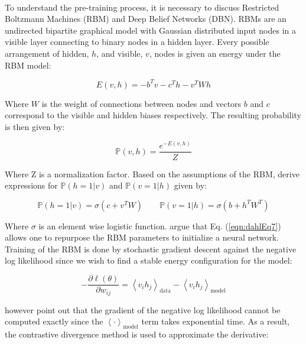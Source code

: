 \documentclass[letterpaper]{article}
\newcommand{\cprob}[2]{ \prob{#1 \lvert #2} }
\newcommand{\prob}[1]{\mathbb{P}\left( #1 \right)}
\newcommand{\partialDx}[2]{\frac{\partial #1}{ \partial #2  }}
\newcommand{\inAngle}[1]{\left \langle #1 \right \rangle}
\begin{document}
\paragraph{} To understand the pre-training process, it is necessary to discuss Restricted Boltzmann Machines (RBM) and Deep Belief Networks (DBN). RBMs are an undirected bipartite graphical model with Gaussian distributed input nodes in a visible layer connecting to binary nodes in a hidden layer. Every possible arrangement of hidden, $h$, and visible, $v$, nodes is given an energy under the RBM model: 

\begin{equation}
E(v, h) = - b^T v - c^T h - v^T W h
\end{equation}

Where $W$ is the weight of connections between nodes and vectors $b$ and $c$ correspond to the visible and hidden biases respectively. The resulting probability is then given by:

\begin{equation}
\prob{v, h} = \frac{e^{-E(v, h)}}{Z}
\end{equation}

Where Z is a normalization factor. Based on the assumptions of the RBM, \cite{DBLP:journals/taslp/DahlYDA12} derive expressions for $\cprob{h = 1}{v}$ and $\cprob{v = 1}{h}$ given by:

\begin{equation}
\cprob{h = 1}{v} = \sigma(c + v^T W) \qquad \cprob{v = 1}{h} = \sigma(b + h^T W^T)
\label{eqn:dahlEq7}
\end{equation}

Where $\sigma$ is an element wise logistic function. \cite{DBLP:journals/taslp/DahlYDA12} argue that Eq. (\ref{eqn:dahlEq7}) allows one to repurpose the RBM parameters to initialize a neural network. Training of the RBM is done by stochastic gradient descent against the negative log likelihood since we wish to find a stable energy configuration for the model:

\begin{equation}
	- \partialDx{\ell(\theta)}{w_{ij}} = \inAngle{ v_i h_j }_\text{data} - \inAngle{ v_i h_j }_\text{model}
\end{equation}

however \cite{DBLP:journals/taslp/DahlYDA12} point out that the gradient of the negative log likelihood cannot be computed exactly since the $\inAngle{ \cdot }_\text{model}$ term takes exponential time. As a result, the contrastive divergence method is used to approximate the derivative:
\end{document}
